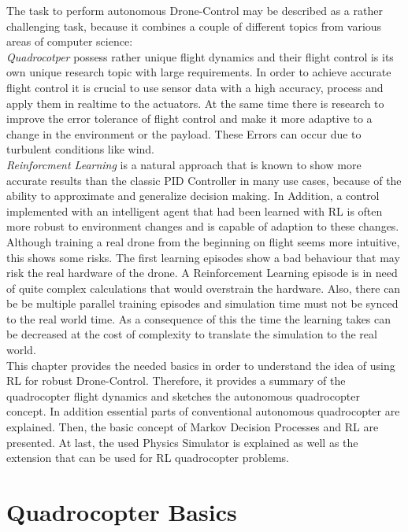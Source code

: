 The task to perform autonomous Drone-Control may be described as a rather challenging task, because it combines a couple of different topics from various areas of computer science:\\
\emph{Quadrocotper} possess rather unique flight dynamics and their flight control is its own unique research topic with large requirements. In order to achieve accurate flight control it is crucial to use sensor data with a high accuracy, process and apply them in realtime to the actuators. At the same time there is research to improve the error tolerance of flight control and make it more adaptive to a change in the environment or the payload. These Errors can occur due to turbulent conditions like wind.\\
\emph{Reinforcment Learning} is a natural approach that is known to show more accurate results than the classic PID Controller in many use cases, because of the ability to approximate and generalize decision making. In Addition, a control implemented with an intelligent agent that had been learned with RL is often more robust to environment changes and is capable of adaption to these changes. \\
Although training a real drone from the beginning on flight seems more intuitive, this shows some risks. The first learning episodes show a bad behaviour that may risk the real hardware of the drone. A Reinforcement Learning episode is in need of quite complex calculations that would overstrain the hardware. Also, there can be be multiple parallel training episodes and simulation time must not be synced to the real world time. As a consequence of this the time the learning takes can be decreased at the cost of complexity to translate the simulation to the real world.\\
\newline
This chapter provides the needed basics in order to understand the idea of using RL for robust Drone-Control. Therefore, it provides a summary of the quadrocopter flight dynamics and sketches the autonomous quadrocopter concept. In addition essential parts of conventional autonomous quadrocopter are explained. 
Then, the basic concept of Markov Decision Processes and RL are presented. At last, the used Physics Simulator is explained as well as the extension that can be used for RL quadrocopter problems.

\newpage


\section{Quadrocopter Basics}

